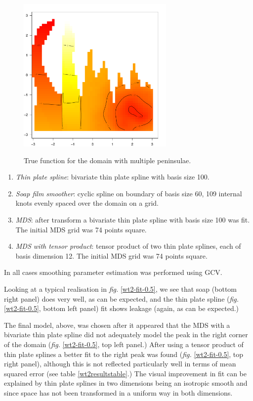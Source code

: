 \documentclass[a4paper,10pt]{article}
\newcommand{\fig}[1]{\emph{fig.} \ref{#1}}
\begin{document}
\begin{figure}
\centering
\includegraphics[width=3in]{figs/wt2-truth.pdf} \\
\caption{True function for the domain with multiple peninsulae.}
\label{wt2-truth}
\end{figure}

\begin{enumerate}
\item \emph{Thin plate spline}: bivariate thin plate spline with basis size 100. 
\item \emph{Soap film smoother}: cyclic spline on boundary of basis size 60, 109 internal knots evenly spaced over the domain on a grid.
\item \emph{MDS}: after transform a bivariate thin plate spline with basis size 100 was fit. The initial MDS grid was 74 points square.
\item \emph{MDS with tensor product}: tensor product of two thin plate splines, each of basis dimension 12. The initial MDS grid was 74 points square.
\end{enumerate} 

In all cases smoothing parameter estimation was performed using GCV.

Looking at a typical realisation in \fig{wt2-fit-0.5}, we see that soap (bottom right panel) does very well, as can be expected, and the thin plate spline (\fig{wt2-fit-0.5}, bottom left panel) fit shows leakage (again, as can be expected.) 

The final model, above, was chosen after it appeared that the MDS with a bivariate thin plate spline did not adequately model the peak in the right corner of the domain (\fig{wt2-fit-0.5}, top left panel.) After using a tensor product of thin plate splines a better fit to the right peak was found (\fig{wt2-fit-0.5}, top right panel), although this is not reflected particularly well in terms of mean squared error (see table \ref{wt2resultstable}.) The visual improvement in fit can be explained by thin plate splines in two dimensions being an isotropic smooth and since space has not been transformed in a uniform way in both dimensions.
\end{document}
